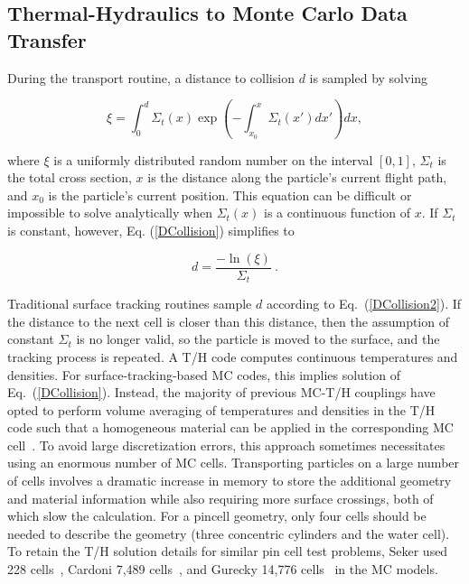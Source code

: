 \documentclass[letterpaper]{physor2018}
\begin{document}
\subsection{Thermal-Hydraulics to Monte Carlo Data Transfer}
\label{sec:THtoMC}
During the transport routine, a distance to collision \(d\) is sampled by solving

\begin{equation}
  \label{DCollision}
\xi=\int_0^d\Sigma_t(x)\exp{\left(-\int_{x_0}^x\Sigma_t(x')dx'\right)}dx,
\end{equation}

where \(\xi\) is a uniformly distributed random number on the interval \([0,1]\), \(\Sigma_t\) is the total
cross section, \(x\) is the distance along the particle's current flight path,
and \(x_0\) is the particle's current position. This equation can be difficult or impossible to solve
analytically when \(\Sigma_t(x)\) is a continuous function of \(x\).
If \(\Sigma_t\) is constant, however, Eq. (\ref{DCollision}) simplifies to

\begin{equation}
\label{DCollision2}
d=\frac{-\ln{(\xi)}}{\Sigma_t}\ .
\end{equation}

Traditional surface tracking routines sample \(d\) according to Eq.~(\ref{DCollision2}).
If the distance to the next cell is closer than this distance, then the assumption of constant
\(\Sigma_t\) is no longer valid, so the particle is moved to the surface,
and the tracking process is repeated.
A T/H code computes continuous temperatures and densities. For surface-tracking-based
MC codes, this implies solution of Eq.~(\ref{DCollision}).
Instead, the majority of previous MC-T/H
couplings have opted to perform volume averaging of temperatures and densities
in the T/H code such that a homogeneous material can be applied in the corresponding
MC cell~\cite{Cardoni,Breitkreutz,Sjenitzer,Gurecky,Ivanov}.
To avoid large discretization errors, this approach sometimes necessitates
using an enormous number of MC cells.
Transporting particles on a large number of cells
involves a dramatic increase in memory to store the additional
geometry and material information
while also requiring more surface crossings,
both of which slow the calculation.
For a pincell geometry, only four cells should be needed to describe the geometry
(three concentric cylinders and the water cell).
To retain the T/H solution details for similar pin cell test
problems, Seker used 228 cells~\cite{Seker}, Cardoni 7,489 cells~\cite{Cardoni},
and Gurecky 14,776 cells~\cite{Gurecky} in the MC models.
\end{document}
